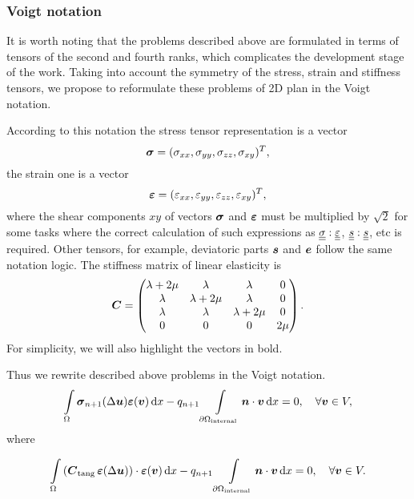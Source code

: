 \documentclass[12pt]{article}
\begin{document}
\subsubsection{Voigt notation}

It is worth noting that the problems described above are formulated in terms of tensors of the second and fourth ranks, which complicates the development stage of the work. Taking into account the symmetry of the stress, strain and stiffness tensors, we propose to reformulate these problems of 2D plan in the Voigt notation.

According to this notation the stress tensor representation is a vector
\begin{equation}
    \mbox{\boldmath$\sigma$} = (\sigma_{xx}, \sigma_{yy}, \sigma_{zz}, \sigma_{xy})^T,  
\end{equation}
the strain one is a vector
\begin{equation}
    \mbox{\boldmath $\varepsilon$} = (\varepsilon_{xx}, \varepsilon_{yy}, \varepsilon_{zz}, \varepsilon_{xy})^T,
\end{equation}
where the shear components $xy$ of vectors $\mbox{\boldmath$\sigma$}$ and $\mbox{\boldmath $\varepsilon$}$ must be multiplied by $\sqrt{2}$ for some tasks where the correct calculation of such expressions as $\underline{\underline{\sigma}}:\underline{\underline{\varepsilon}}$, $\underline{\underline{s}}:\underline{\underline{s}}$, etc is required. Other tensors, for example, deviatoric parts $\mbox{\boldmath $s$}$ and $\mbox{\boldmath $e$}$ follow the same notation logic. The stiffness matrix of linear elasticity is 
\begin{equation}
    \mbox{\boldmath $C$} = 
    \begin{pmatrix}
        \lambda + 2\mu & \lambda & \lambda & 0 \\
        \lambda & \lambda + 2\mu & \lambda & 0 \\
        \lambda & \lambda & \lambda + 2\mu & 0 \\
        0 & 0 & 0 & 2\mu 
    \end{pmatrix}.
\end{equation}
For simplicity, we will also highlight the vectors in bold.

Thus we rewrite described above problems in the Voigt notation.
\begin{equation}
    \int\limits_\Omega\mbox{\boldmath$\sigma$}_{n+1}(\Delta\mbox{\boldmath $u$})\mbox{\boldmath $\varepsilon$}(\mbox{\boldmath $v$}) \, \mathrm{d} x - q_{n+1}\int\limits_{\partial\Omega_\text{internal}}\mbox{\boldmath $n$} \cdot \mbox{\boldmath $v$} \, \mathrm{d} x = 0, \quad \forall \mbox{\boldmath $v$} \in V,
\end{equation}
where 

\begin{equation}
    \int\limits_\Omega \left( \mbox{\boldmath $C$}_{\text{tang}} \, \mbox{\boldmath $\varepsilon$}(\Delta\mbox{\boldmath $u$}) \right) \cdot \mbox{\boldmath $\varepsilon$}(\mbox{\boldmath $v$}) \, \mathrm{d} x - q_{n+1}\int\limits_{\partial\Omega_\text{internal}}\mbox{\boldmath $n$} \cdot \mbox{\boldmath $v$} \, \mathrm{d} x = 0, \quad \forall \mbox{\boldmath $v$} \in V.
\end{equation}
\end{document}
